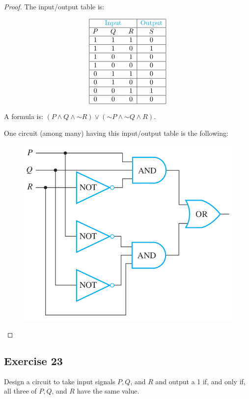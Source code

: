 \documentclass[14pt]{extarticle}
\begin{document}
\begin{proof}
The input/output table is:

$$
\begin{array}{|ccc|c|}
\hline
& \color{cyan}\text{Input} & & \color{cyan}\text{Output} \\
\hline
P&Q&R&S\\
\hline
1&1&1&0\\
\hline
1&1&0&1\\
\hline
1&0&1&0\\
\hline
1&0&0&0\\
\hline
0&1&1&0\\
\hline
0&1&0&0\\
\hline
0&0&1&1\\
\hline
0&0&0&0\\
\hline
\end{array}
$$

A formula is: $(P \wedge Q \wedge {\sim R}) \vee ({\sim P} \wedge {\sim Q} \wedge R)$.

One circuit (among many) having this input/output table is the following:

\begin{figure}[ht!]
\centering
\includegraphics[scale=0.5]{../images/2.4.22.png}
\end{figure}
\end{proof}

\subsection{Exercise 23}
Design a circuit to take input signals $P, Q$, and $R$ and output a 1 if, and only if, all three of $P, Q$, and $R$ have the same value.
\end{document}
